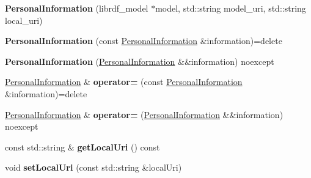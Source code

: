 \begin{DoxyCompactItemize}
\item 
\mbox{\label{classomexmeta_1_1PersonalInformation_a7494a26893d42e33953dee18bc6db4e4}} 
{\bfseries Personal\+Information} (librdf\+\_\+model $\ast$model, std\+::string model\+\_\+uri, std\+::string local\+\_\+uri)
\item 
\mbox{\label{classomexmeta_1_1PersonalInformation_a75cedb2a97efb996852b4e7cd39d6440}} 
{\bfseries Personal\+Information} (const \hyperlink{classomexmeta_1_1PersonalInformation}{Personal\+Information} \&information)=delete
\item 
\mbox{\label{classomexmeta_1_1PersonalInformation_a6653d6c5751154f5f33562d9879d6727}} 
{\bfseries Personal\+Information} (\hyperlink{classomexmeta_1_1PersonalInformation}{Personal\+Information} \&\&information) noexcept
\item 
\mbox{\label{classomexmeta_1_1PersonalInformation_a11a759dd5f065ba6a48f0bc3b4c48438}} 
\hyperlink{classomexmeta_1_1PersonalInformation}{Personal\+Information} \& {\bfseries operator=} (const \hyperlink{classomexmeta_1_1PersonalInformation}{Personal\+Information} \&information)=delete
\item 
\mbox{\label{classomexmeta_1_1PersonalInformation_a048a3377b27d4b87681e4f8c24dd8c4f}} 
\hyperlink{classomexmeta_1_1PersonalInformation}{Personal\+Information} \& {\bfseries operator=} (\hyperlink{classomexmeta_1_1PersonalInformation}{Personal\+Information} \&\&information) noexcept
\item 
\mbox{\label{classomexmeta_1_1PersonalInformation_aef8b8cfd83f8247b487d58f887c93e54}} 
const std\+::string \& {\bfseries get\+Local\+Uri} () const
\item 
\mbox{\label{classomexmeta_1_1PersonalInformation_ab7d25a7a99ae29ef8cbb004343b9b540}} 
void {\bfseries set\+Local\+Uri} (const std\+::string \&local\+Uri)
\item 
\mbox{\label{classomexmeta_1_1PersonalInformation_a84ce9ae11ad2ed4a01fe1b5b84707146}} 

\end{DoxyCompactItemize}
